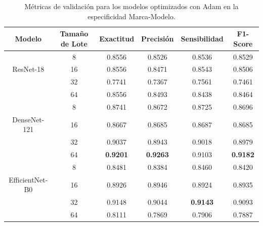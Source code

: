 \begin{table}[H]
	\centering
	\begin{adjustbox}
		{width=\textwidth}
		\begin{tabular}{|c|c|c|c|c|c|}
			\hline
			\textbf{Modelo}             & \textbf{Tamaño de Lote} & \textbf{Exactitud} & \textbf{Precisión} & \textbf{Sensibilidad} & \textbf{F1-Score} \\
			\hline
			& 8                       & 0.8556             & 0.8526             & 0.8536                & 0.8529            \\
			\cline{2-6} ResNet-18       & 16                      & 0.8556             & 0.8471             & 0.8543                & 0.8506            \\
			\cline{2-6}                 & 32                      & 0.7741             & 0.7367             & 0.7561                & 0.7461            \\
			\cline{2-6}                 & 64                      & 0.8556             & 0.8493             & 0.8438                & 0.8464            \\
			\hline
			& 8                       & 0.8741             & 0.8672             & 0.8725                & 0.8696            \\
			\cline{2-6} DenseNet-121    & 16                      & 0.8667             & 0.8685             & 0.8687                & 0.8685            \\
			\cline{2-6}                 & 32                      & 0.9037             & 0.8943             & 0.9018                & 0.8979            \\
			\cline{2-6}                 & 64                      & \textbf{0.9201}    & \textbf{0.9263}    & 0.9103                & \textbf{0.9182}   \\
			\hline
			& 8                       & 0.8481             & 0.8384             & 0.8460                & 0.8420            \\
			\cline{2-6} EfficientNet-B0 & 16                      & 0.8926             & 0.8946             & 0.8924                & 0.8935            \\
			\cline{2-6}                 & 32                      & 0.9148             & 0.9044             & \textbf{0.9143}       & 0.9093            \\
			\cline{2-6}                 & 64                      & 0.8111             & 0.7869             & 0.7906                & 0.7887            \\
			\hline
		\end{tabular}
	\end{adjustbox}
	\caption{Métricas de validación para los modelos optimizados con Adam en la
		especificidad Marca-Modelo.}
	\label{tab:adam_metrics_mm}
\end{table}

